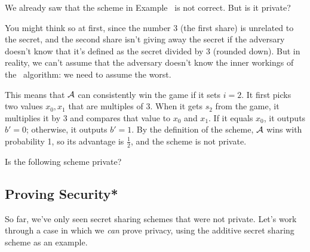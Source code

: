 \begin{example}
    We already saw that the scheme in Example~ is not correct.
    But is it private?

    You might think so at first, since the number 3 (the first share) is
    unrelated to the secret, and the second share isn't giving away the 
    secret if the adversary doesn't know that it's defined as the secret 
    divided by 3 (rounded down).
    But in reality, we can't assume that the adversary doesn't know the 
    inner workings of the \share~algorithm: we need to assume the worst.
    
    This means that $\mathcal{A}$ can consistently win the game if it sets $i = 2$.
    It first picks two values $x_0, x_1$ that are multiples of 3.
    When it gets $s_2$ from the game, it multiplies it by 3 and compares that 
    value to $x_0$ and $x_1$. If it equals $x_0$, it outputs $b' = 0$; 
    otherwise, it outputs $b' = 1$. By the definition of the scheme, $\mathcal{A}$ 
    wins with probability 1, so its advantage is $\frac{1}{2}$, and the 
    scheme is not private.
\end{example}

\begin{bonus}
    Is the following scheme private?
    \begin{pchstack}[center]
    \pchspace
    \end{pchstack}
\end{bonus}

\subsection{Proving Security*}\label{sec:proof}

So far, we've only seen secret sharing schemes that were not private.
Let's work through a case in which we \emph{can} prove privacy, using the additive secret sharing 
scheme as an example.

